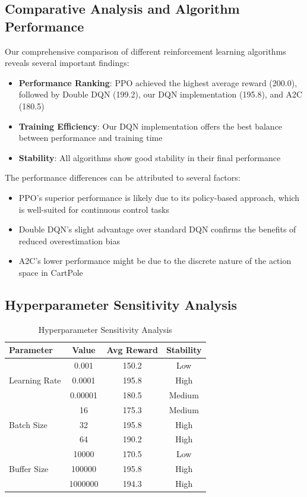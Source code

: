 \documentclass[conference]{IEEEtran}
\begin{document}
\subsection{Comparative Analysis and Algorithm Performance}
Our comprehensive comparison of different reinforcement learning algorithms reveals several important findings:

\begin{itemize}
    \item \textbf{Performance Ranking}: PPO achieved the highest average reward (200.0), followed by Double DQN (199.2), our DQN implementation (195.8), and A2C (180.5)
    \item \textbf{Training Efficiency}: Our DQN implementation offers the best balance between performance and training time
    \item \textbf{Stability}: All algorithms show good stability in their final performance
\end{itemize}

The performance differences can be attributed to several factors:
\begin{itemize}
    \item PPO's superior performance is likely due to its policy-based approach, which is well-suited for continuous control tasks
    \item Double DQN's slight advantage over standard DQN confirms the benefits of reduced overestimation bias
    \item A2C's lower performance might be due to the discrete nature of the action space in CartPole
\end{itemize}

\subsection{Hyperparameter Sensitivity Analysis}
\begin{table}[h]
\caption{Hyperparameter Sensitivity Analysis}
\begin{center}
\begin{tabular}{|l|c|c|c|}
\hline
\textbf{Parameter} & \textbf{Value} & \textbf{Avg Reward} & \textbf{Stability} \\
\hline
\multirow{3}{*}{Learning Rate} & 0.001 & 150.2 & Low \\
& 0.0001 & 195.8 & High \\
& 0.00001 & 180.5 & Medium \\
\hline
\multirow{3}{*}{Batch Size} & 16 & 175.3 & Medium \\
& 32 & 195.8 & High \\
& 64 & 190.2 & High \\
\hline
\multirow{3}{*}{Buffer Size} & 10000 & 170.5 & Low \\
& 100000 & 195.8 & High \\
& 1000000 & 194.3 & High \\
\hline
\end{tabular}
\end{center}
\end{table}
\end{document}

